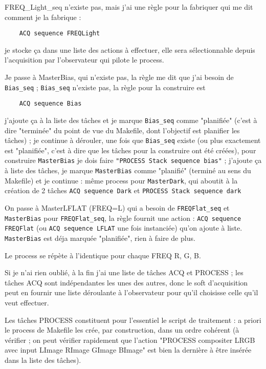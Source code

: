 \documentclass[10pt,a4paper,french]{article}
\begin{document}
FREQ\_Light\_seq n'existe pas, mais j'ai une règle pour la fabriquer qui me dit
comment je la fabrique : 

\begin{verbatim}
	ACQ sequence FREQLight 
\end{verbatim}
je stocke ça dans une liste des actions à effectuer, elle sera sélectionnable depuis
l'acquisition par l'observateur qui pilote le process.

Je passe à MasterBias, qui n'existe pas, la règle me dit que j'ai besoin de {\tt{Bias\_seq}} ;
{\tt{Bias\_seq}} n'existe pas, la règle pour la construire est 

\begin{verbatim}
	ACQ sequence Bias
\end{verbatim}

j'ajoute ça à la liste des tâches  et je marque {\tt{Bias\_seq}} comme "planifiée" (c'est à dire "terminée" 
du point de vue du Makefile, dont l'objectif est planifier les tâches) ; 
je continue à dérouler, une fois que {\tt{Bias\_seq}} existe (ou plus exactement est "planifiée",
c'est à dire que les tâches pour la construire ont été créées), pour construire {\tt{MasterBias}} je dois
faire {\tt{"PROCESS Stack sequence bias"}} ; j'ajoute ça à liste des tâches, je marque {\tt{MasterBias}}
comme "planifié" (terminé au sens du Makefile) et je continue :
même process pour {\tt{MasterDark}}, qui aboutit à la création de 2 tâches
{\tt{ACQ sequence Dark}} et {\tt{PROCESS Stack sequence dark}}

On passe à MasterLFLAT (FREQ=L) qui a besoin de {\tt{FREQFlat\_seq}} et {\tt{MasterBias}}
pour {\tt{FREQFlat\_seq}}, la règle fournit une action :
{\tt{ACQ sequence FREQFlat}} (ou {\tt{ACQ sequence LFLAT}} une fois instanciée) qu'on ajoute à liste.
{\tt{MasterBias}} est déja marquée "planifiée", rien à faire de plus.

Le process se répète à l'identique pour chaque FREQ R, G, B.

Si je n'ai rien oublié, à la fin j'ai une liste de tâches ACQ et PROCESS ;
les tâches ACQ sont indépendantes les unes des autres, donc le soft
d'acquisition peut en fournir une liste déroulante à l'observateur
pour qu'il choisisse celle qu'il veut effectuer.

Les tâches PROCESS constituent pour l'essentiel le script de traitement :
a priori le process de Makefile les crée, par construction, dans un ordre 
cohérent (à vérifier ; on peut vérifier rapidement que l'action 
"PROCESS compositer LRGB avec input LImage RImage GImage BImage" est bien la dernière
à être insérée dans la liste des tâches).
\end{document}
